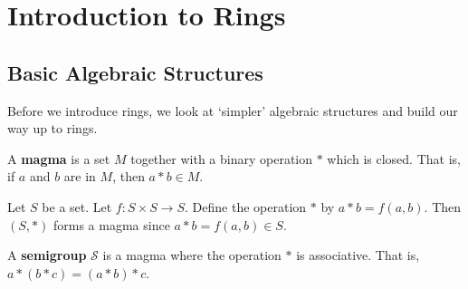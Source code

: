 
\usepackage{xr}

\newcommand{\version}{0.1}
\newcommand{\volumenumber}{2}
\newcommand{\volumename}{Rings}

\newcommand{\quotepagetext}{
    [Some] of the major discoveries in ring theory have helped shape the course of development of modern abstract algebra... A course in ring theory is an indispensable part of the education of any fledgling algebraist.
}
\newcommand{\quotepageattribution}{Tsit-Yuen Lam, 2001}
\newcommand{\quotepagecitation}{\cite{lam_2001}}

\newcommand{\prefacevolumetext}{
    This volume covers the basics of ring theory. %
}

\linespread{1.05}




\frontmatterpages

\chapter{Introduction to Rings}
\section{Basic Algebraic Structures}
Before we introduce rings, we look at `simpler' algebraic structures and build our way up to rings.

\begin{definition}
    A \textbf{magma} is a set $M$ together with a binary operation $\ast$ which is closed. That is, if $a$ and $b$ are in $M$, then $a \ast b \in M$.
\end{definition}

\begin{example}
    Let $S$ be a set. Let $f: S \times S \to S$. Define the operation $\ast$ by $a \ast b = f(a, b)$. Then $(S, \ast)$ forms a magma since $a\ast b = f(a,b) \in S$.
\end{example}

\begin{definition}
    A \textbf{semigroup} $\mathcal{S}$ is a magma where the operation $\ast$ is associative. That is, $a\ast(b\ast c) = (a\ast b)\ast c$.
\end{definition}

